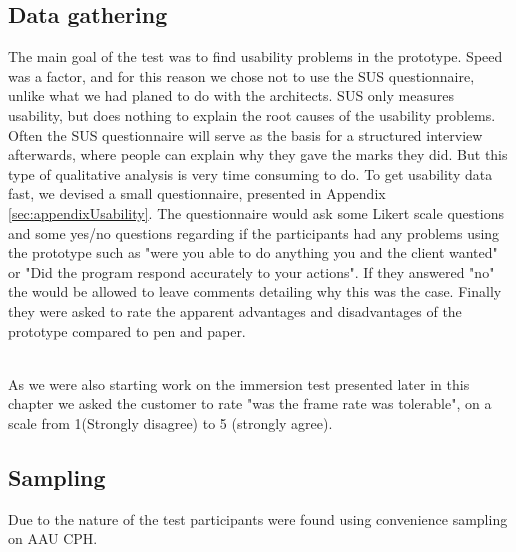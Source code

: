 \subsection{Data gathering}
The main goal of the test was to find usability problems in the prototype. Speed was a factor, and for this reason we chose not to use the SUS questionnaire, unlike what we had planed to do with the architects. SUS only measures usability, but does nothing to explain the root causes of the usability problems. Often the SUS questionnaire will serve as the basis for a structured interview afterwards, where people can explain why they gave the marks they did. But this type of qualitative analysis is very time consuming to do. To get usability data fast, we devised a small questionnaire, presented in Appendix \ref{sec:appendixUsability}. The questionnaire would ask some Likert scale questions and some yes/no questions regarding if the participants had any problems using the prototype such as "were you able to do anything you and the client wanted" or "Did the program respond accurately to your actions". If they answered "no" the would be allowed to leave comments detailing why this was the case. Finally they were asked to rate the apparent advantages and disadvantages of the prototype compared to pen and paper.\\\

As we were also starting work on the immersion test presented later in this chapter we asked the customer to rate "was the frame rate was tolerable", on a scale from 1(Strongly disagree) to 5 (strongly agree).
\subsection{Sampling}
Due to the nature of the test participants were found using convenience sampling on AAU CPH.
